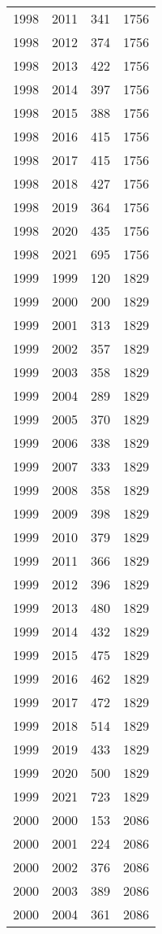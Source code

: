 \documentclass[
  10pt,
  letterpaper,
  DIV=11,
  numbers=noendperiod,
  twoside]{scrartcl}
\begin{document}
\begin{longtable}[]{@{}rrrr@{}}
1998 & 2011 & 341 & 1756 \\
1998 & 2012 & 374 & 1756 \\
1998 & 2013 & 422 & 1756 \\
1998 & 2014 & 397 & 1756 \\
1998 & 2015 & 388 & 1756 \\
1998 & 2016 & 415 & 1756 \\
1998 & 2017 & 415 & 1756 \\
1998 & 2018 & 427 & 1756 \\
1998 & 2019 & 364 & 1756 \\
1998 & 2020 & 435 & 1756 \\
1998 & 2021 & 695 & 1756 \\
1999 & 1999 & 120 & 1829 \\
1999 & 2000 & 200 & 1829 \\
1999 & 2001 & 313 & 1829 \\
1999 & 2002 & 357 & 1829 \\
1999 & 2003 & 358 & 1829 \\
1999 & 2004 & 289 & 1829 \\
1999 & 2005 & 370 & 1829 \\
1999 & 2006 & 338 & 1829 \\
1999 & 2007 & 333 & 1829 \\
1999 & 2008 & 358 & 1829 \\
1999 & 2009 & 398 & 1829 \\
1999 & 2010 & 379 & 1829 \\
1999 & 2011 & 366 & 1829 \\
1999 & 2012 & 396 & 1829 \\
1999 & 2013 & 480 & 1829 \\
1999 & 2014 & 432 & 1829 \\
1999 & 2015 & 475 & 1829 \\
1999 & 2016 & 462 & 1829 \\
1999 & 2017 & 472 & 1829 \\
1999 & 2018 & 514 & 1829 \\
1999 & 2019 & 433 & 1829 \\
1999 & 2020 & 500 & 1829 \\
1999 & 2021 & 723 & 1829 \\
2000 & 2000 & 153 & 2086 \\
2000 & 2001 & 224 & 2086 \\
2000 & 2002 & 376 & 2086 \\
2000 & 2003 & 389 & 2086 \\
2000 & 2004 & 361 & 2086 \\

\end{longtable}
\end{document}
